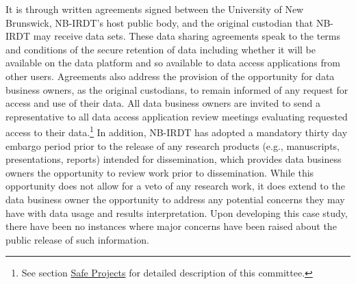 \documentclass[
]{WileySix}
\begin{document}
It is through written agreements signed between the University of New Brunswick, NB-IRDT's host public body, and the original custodian that NB-IRDT may receive data sets. These data sharing agreements speak to the terms and conditions of the secure retention of data including whether it will be available on the data platform and so available to data access applications from other users. Agreements also address the provision of the opportunity for data business owners, as the original custodians, to remain informed of any request for access and use of their data. All data business owners are invited to send a representative to all data access application review meetings evaluating requested access to their data.\footnote{See section \protect\hyperlink{safe-projects-8}{Safe Projects} for detailed description of this committee.} In addition, NB-IRDT has adopted a mandatory thirty day embargo period prior to the release of any research products (e.g., manuscripts, presentations, reports) intended for dissemination, which provides data business owners the opportunity to review work prior to dissemination. While this opportunity does not allow for a veto of any research work, it does extend to the data business owner the opportunity to address any potential concerns they may have with data usage and results interpretation. Upon developing this case study, there have been no instances where major concerns have been raised about the public release of such information.
\end{document}
